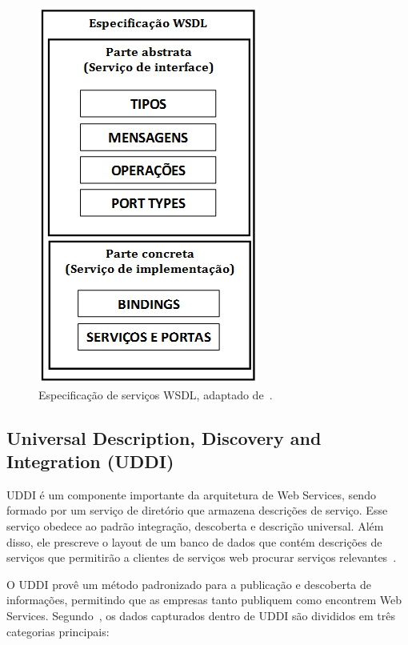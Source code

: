 \begin{figure}[!htb]
\centering
\includegraphics[scale=0.5]{COMPOSICAO_WSDL.jpg}
\caption{Especificação de serviços WSDL, adaptado de~\cite{Bertino2010}.}
\label{fig:composicao_WSDL}
\end{figure}


\subsection{Universal Description, Discovery and Integration (UDDI)}

UDDI é um componente importante da arquitetura de Web Services, sendo formado por um serviço de diretório que armazena descrições de serviço. Esse serviço obedece ao padrão integração, descoberta e descrição universal. Além disso,  ele prescreve o layout de um banco de dados que contém  descrições de serviços que permitirão a clientes de serviços web procurar serviços relevantes~\cite{TANENBAUM2007}.

O UDDI provê um método padronizado para a publicação e descoberta de informações, permitindo que as empresas tanto publiquem como encontrem Web Services. Segundo~\cite{Cerami2002}, os dados capturados dentro de UDDI são divididos em três categorias principais:

